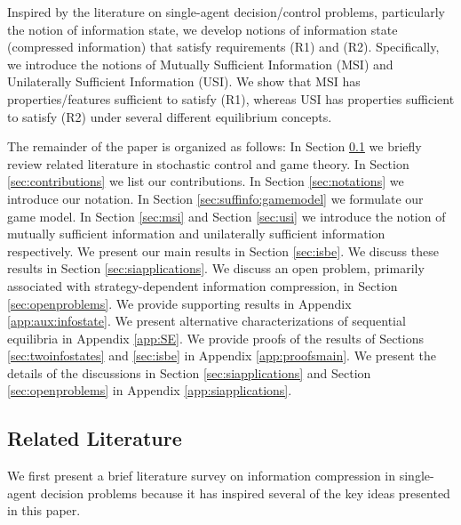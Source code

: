 \documentclass[pdflatex,sn-basic]{sn-jnl}
\theoremstyle{thmstyleone}%
\theoremstyle{thmstyletwo}%
\theoremstyle{thmstylethree}%
\begin{document}
Inspired by the literature on single-agent decision/control problems, particularly the notion of information state, we develop notions of information state (compressed information) that satisfy requirements (R1) and (R2). Specifically, we introduce the notions of Mutually Sufficient Information (MSI) and Unilaterally Sufficient Information (USI). We show that MSI has properties/features sufficient to satisfy (R1), whereas USI has properties sufficient to satisfy (R2) under several different equilibrium concepts.

The remainder of the paper is organized as follows: In Section \ref{sec:litreview} we briefly review related literature in stochastic control and game theory. In Section \ref{sec:contributions} we list our contributions. In Section \ref{sec:notations} we introduce our notation. In Section \ref{sec:suffinfo:gamemodel} we formulate our game model. In Section \ref{sec:msi} and Section \ref{sec:usi} we introduce the notion of mutually sufficient information and unilaterally sufficient information respectively. We {present our main} results in Section \ref{sec:isbe}. We discuss {these} results in Section \ref{sec:siapplications}. 
{We discuss an open problem, primarily associated with strategy-dependent information compression, in Section \ref{sec:openproblems}.}
{We provide} supporting results in Appendix \ref{app:aux:infostate}. {We present} alternative characterizations of sequential equilibria in Appendix \ref{app:SE}. {We provide proofs of the results of Sections \ref{sec:twoinfostates} and \ref{sec:isbe}}
in Appendix \ref{app:proofsmain}. {We present the details of the discussions in Section \ref{sec:siapplications} and Section \ref{sec:openproblems} in Appendix \ref{app:siapplications}.} 

\subsection{Related Literature}\label{sec:litreview}
{We first present a brief literature survey on information compression in single-agent decision problems because it has inspired several of the key ideas presented in this paper.}
\end{document}
